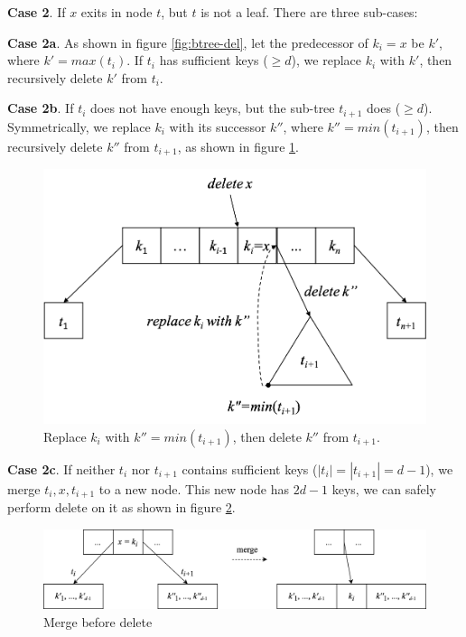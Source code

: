 \documentclass[b5paper]{article}
\begin{document}
\textbf{Case 2}. If $x$ exits in node $t$, but $t$ is not a leaf. There are three sub-cases:

\textbf{Case 2a}. As shown in figure \ref{fig:btree-del}, let the predecessor of $k_i = x$ be $k'$, where $k' = max(t_i)$. If $t_i$ has sufficient keys ($\geq d$), we replace $k_i$ with $k'$, then recursively delete $k'$ from $t_i$.

\textbf{Case 2b}. If $t_i$ does not have enough keys, but the sub-tree $t_{i+1}$ does ($\geq d$). Symmetrically, we replace $k_i$ with its successor $k''$, where $k'' = min(t_{i+1})$, then recursively delete $k''$ from $t_{i+1}$, as shown in figure \ref{fig:btree-del-case2b}.

\begin{figure}[htbp]
  \centering
  \includegraphics[scale=0.5]{img/btree-del-case2b.png}
  \caption{Replace $k_i$ with $k'' = min(t_{i+1})$, then delete $k''$ from $t_{i+1}$.}
  \label{fig:btree-del-case2b}
\end{figure}

\textbf{Case 2c}. If neither $t_i$ nor $t_{i+1}$ contains sufficient keys ($|t_i| = |t_{i+1}| = d - 1$), we merge $t_i, x, t_{i+1}$ to a new node. This new node has $2d - 1$ keys, we can safely perform delete on it as shown in figure \ref{fig:btree-del-merge}.

\begin{figure}[htbp]
  \centering
  \includegraphics[scale=0.65]{img/btree-del-merge.png}
  \caption{Merge before delete}
  \label{fig:btree-del-merge}
\end{figure}
\end{document}
